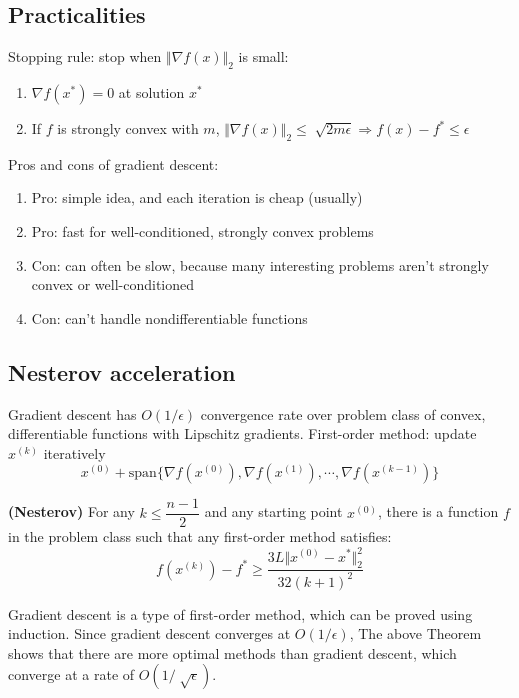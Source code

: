 \documentclass[a4paper]{article}
\begin{document}
{\subsection{Practicalities}
Stopping rule: stop when $\Vert \nabla f(x) \Vert_2$ is small:
\begin{enumerate}
  \item $\nabla f(x^*) = 0$ at solution $x^*$
  \item If $f$ is strongly convex with $m$, $\Vert \nabla f(x) \Vert_2 \leq \sqrt[]{2m \epsilon} \Rightarrow f(x) - f^* \leq \epsilon$ 
\end{enumerate}
\noindent Pros and cons of gradient descent:
\begin{enumerate}
  \item Pro: simple idea, and each iteration is cheap (usually)
  \item Pro: fast for well-conditioned, strongly convex problems
  \item Con: can often be slow, because many interesting problems
  aren't strongly convex or well-conditioned
  \item Con: can't handle nondifferentiable functions
\end{enumerate}

\subsection{Nesterov acceleration}
Gradient descent has $O(1 / \epsilon)$ convergence rate over problem class of convex, differentiable functions with Lipschitz gradients.
First-order method: update $x^{(k)}$ iteratively
\begin{equation}
  x^{(0)} + \text{span} \{\nabla f(x^{(0)}), \nabla f(x^{(1)}), \cdots, \nabla f(x^{(k-1)}) \} \nonumber
\end{equation}
\begin{thm} \textbf{(Nesterov)} For any $k \leq \dfrac{n-1}{2}$ and any starting point $x^{(0)}$, there is a function $f$ in the
  problem class such that any first-order method satisfies:
  \[
    f(x^{(k)}) - f^* \geq \dfrac{3L \Vert x^{(0)} - x^* \Vert_2^2}{32(k+1)^2} \nonumber
  \]
\end{thm}
\noindent Gradient descent is a type of first-order method, which can be proved using induction. Since gradient descent converges at $O(1 / \epsilon)$, The above Theorem shows that there are more optimal methods than gradient descent, which converge at a rate of $O(1 / \sqrt[]{\epsilon} )$.

}
\end{document}
